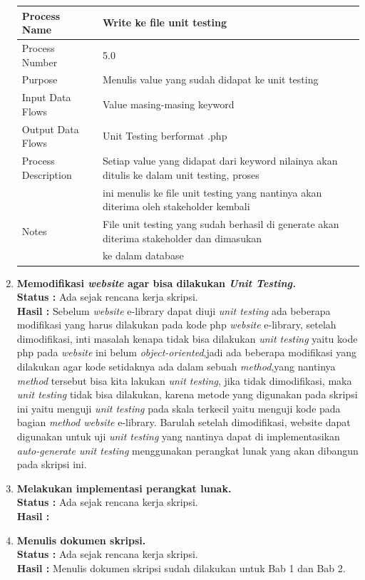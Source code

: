 \documentclass[a4paper,twoside]{article}
\begin{document}
\begin{enumerate}
\begin{center}
\begin{tabular}{ |l|l| } 
 \hline
 Process Name & Write ke file unit testing \\ 
 \hline
 Process Number & 5.0  \\ 
 \hline
 Purpose & Menulis value yang sudah didapat ke unit testing \\ 
 \hline
 Input Data Flows & Value masing-masing keyword \\
 \hline
 Output Data Flows & Unit Testing berformat .php \\
 \hline
 Process Description & Setiap value yang didapat dari keyword nilainya akan ditulis ke dalam unit testing, proses \\
 & ini menulis ke file unit testing yang nantinya akan diterima oleh stakeholder kembali\\
 \hline
 Notes & File unit testing yang sudah berhasil di generate akan diterima stakeholder dan dimasukan \\
 & ke dalam database\\
 \hline
\end{tabular}
\end{center}
		
\item \textbf{Memodifikasi \textit{website} agar bisa dilakukan \textit{Unit Testing.}}\\
\textbf{Status :} Ada sejak rencana kerja skripsi.\\
\textbf{Hasil :} Sebelum \textit{website} e-library dapat diuji \textit{unit testing} ada beberapa modifikasi yang harus dilakukan pada kode php \textit{website} e-library, setelah dimodifikasi, inti masalah kenapa tidak bisa dilakukan \textit{unit testing} yaitu kode php pada \textit{website} ini belum \textit{object-oriented},jadi ada beberapa modifikasi yang dilakukan agar kode setidaknya ada dalam sebuah \textit{method},yang nantinya \textit{method} tersebut bisa kita lakukan \textit{unit testing}, jika tidak dimodifikasi, maka \textit{unit testing} tidak bisa dilakukan, karena metode yang digunakan pada skripsi ini yaitu menguji \textit{unit testing} pada skala terkecil yaitu menguji kode pada bagian \textit{method website} e-library. Barulah setelah dimodifikasi, website dapat digunakan untuk uji \textit{unit testing} yang nantinya dapat di implementasikan \textit{auto-generate unit testing} menggunakan perangkat lunak yang akan dibangun pada skripsi ini.

\item \textbf{Melakukan implementasi perangkat lunak.}\\
\textbf{Status :} Ada sejak rencana kerja skripsi.\\
\textbf{Hasil :}

		\item \textbf{Menulis dokumen skripsi.}\\
		{\bf Status :} Ada sejak rencana kerja skripsi.\\
		{\bf Hasil :} Menulis dokumen skripsi sudah dilakukan untuk Bab 1 dan Bab 2.

	\end{enumerate}
\end{document}

